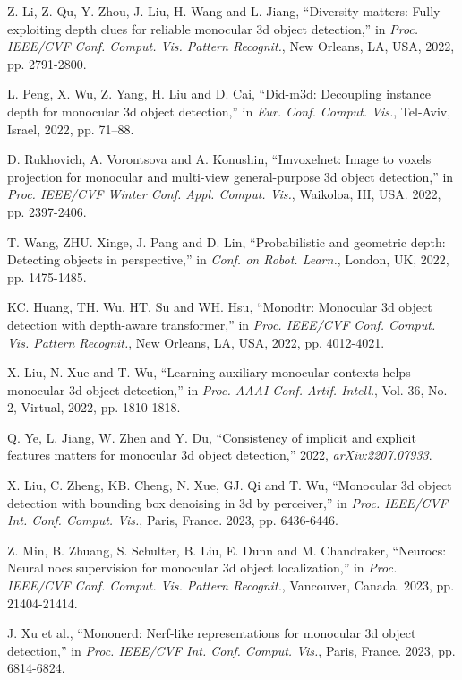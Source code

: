 \documentclass[journal]{IEEEtran}
\begin{document}
\begin{thebibliography}{1}
		Z. Li, Z. Qu, Y. Zhou, J. Liu, H. Wang and L. Jiang, “Diversity matters: Fully exploiting depth clues for reliable monocular 3d object detection,” in \textit{Proc. IEEE/CVF Conf. Comput. Vis. Pattern Recognit.}, New Orleans, LA, USA, 2022, pp. 2791-2800.
		
		L. Peng, X. Wu, Z. Yang, H. Liu and D. Cai, “Did-m3d: Decoupling instance depth for monocular 3d object detection,” in \textit{Eur. Conf. Comput. Vis.}, Tel-Aviv, Israel, 2022, pp. 71–88.
				
		D. Rukhovich, A. Vorontsova and A. Konushin, “Imvoxelnet: Image to voxels projection for monocular and multi-view general-purpose 3d object detection,” in \textit{Proc. IEEE/CVF Winter Conf. Appl. Comput. Vis.}, Waikoloa, HI, USA. 2022, pp. 2397-2406.
		
		T. Wang, ZHU. Xinge, J. Pang and D. Lin, “Probabilistic and geometric depth: Detecting objects in perspective,” in \textit{Conf. on Robot. Learn.}, London, UK, 2022, pp. 1475-1485.
			
		KC. Huang, TH. Wu, HT. Su and WH. Hsu, “Monodtr: Monocular 3d object detection with depth-aware transformer,” in \textit{Proc. IEEE/CVF Conf. Comput. Vis. Pattern Recognit.}, New Orleans, LA, USA, 2022,  pp. 4012-4021.
		
		
		X. Liu, N. Xue and T. Wu, “Learning auxiliary monocular contexts helps monocular 3d object detection,” in \textit{Proc. AAAI Conf. Artif. Intell.}, Vol. 36, No. 2, Virtual, 2022, pp. 1810-1818.
		
		Q. Ye, L. Jiang, W. Zhen and Y. Du, “Consistency of implicit and explicit features matters for monocular 3d object detection,” 2022, \textit{arXiv:2207.07933}.
		
		X. Liu, C. Zheng, KB. Cheng, N. Xue, GJ. Qi and T. Wu, “Monocular 3d object detection with bounding box denoising in 3d by perceiver,” in \textit{Proc. IEEE/CVF Int. Conf. Comput. Vis.}, Paris, France. 2023, pp. 6436-6446.
		
		Z. Min, B. Zhuang, S. Schulter, B. Liu, E. Dunn and M. Chandraker, “Neurocs: Neural nocs supervision for monocular 3d object localization,” in \textit{Proc. IEEE/CVF Conf. Comput. Vis. Pattern Recognit.}, Vancouver, Canada. 2023, pp. 21404-21414. 
		
		J. Xu et al., “Mononerd: Nerf-like representations for monocular 3d object detection,” in \textit{Proc. IEEE/CVF Int. Conf. Comput. Vis.}, Paris, France. 2023, pp. 6814-6824. 
		

\end{thebibliography}
\end{document}
